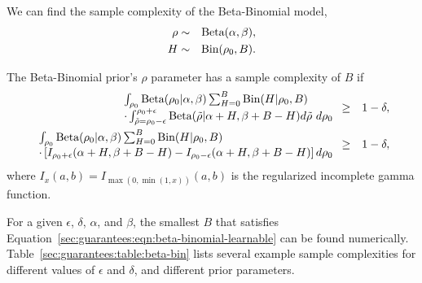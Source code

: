 \begin{example}

\label{sec:guarantees:beta-bin}

We can find the sample complexity of the Beta-Binomial model,
\begin{eqnarray}
\label{sec:guarantees:eqn:beta-bin-beta}
\rho &\sim& \mbox{Beta}(\alpha,\beta),\\
\label{sec:guarantees:eqn:beta-bin-bin}
H &\sim& \mbox{Bin}(\rho_0, B).
\end{eqnarray}

The Beta-Binomial prior's $\rho$ parameter has a sample complexity of $B$ if
\begin{eqnarray}
\begin{array}{l}
\int_{\rho_0} \dBeta(\rho_0|\alpha,\beta)
 \sum_{H=0}^B \dBin(H|\rho_0,B)\\
 \cdot
  \int_{\tilde\rho=\rho_0-\epsilon}^{\rho_0+\epsilon} \dBeta(\tilde\rho|\alpha+H,\beta+B-H)
   d\tilde\rho \
  d\rho_0
  \end{array}
&\geq& 1-\delta,\\
%
\label{sec:guarantees:eqn:beta-binomial-learnable}
\begin{array}{l}
\int_{\rho_0} \dBeta(\rho_0|\alpha,\beta)
 \sum_{H=0}^B \dBin(H|\rho_0,B)\\
  \cdot \left[
   I_{\rho_0+\epsilon}(\alpha+H,\beta+B-H)
   -I_{\rho_0-\epsilon}(\alpha+H,\beta+B-H)
  \right]
  d\rho_0
\end{array}
&\geq& 1-\delta,
\end{eqnarray}
where $I_x(a,b)=I_{\max(0, \min(1, x))}(a,b)$ is the regularized incomplete gamma function.

For a given $\epsilon$, $\delta$, $\alpha$, and $\beta$, the smallest $B$ that satisfies Equation~\ref{sec:guarantees:eqn:beta-binomial-learnable} can be found numerically. Table~\ref{sec:guarantees:table:beta-bin} lists several example sample complexities for different values of $\epsilon$ and $\delta$, and different prior parameters.


\begin{table}
\caption{Sample complexity for the Beta-Binomial. Using the model from Section~\ref{sec:guarantees:beta-bin}, the posterior for the latent variable $\rho$ is $\epsilon$-accurate with probability at least $1-\delta$ if $B$ is above some threshold. This table gives examples of the relations between the model hyperparameters, $\epsilon$, $\delta$, and $B$. }
\label{sec:guarantees:table:beta-bin}
\\
\end{table}


\end{example}
